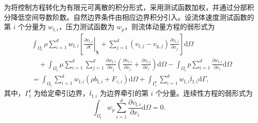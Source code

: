 为将控制方程转化为有限元可离散的积分形式，采用测试函数加权，并通过分部积分降低空间导数阶数。自然边界条件由相应边界积分引入。设流体速度测试函数的第 $i$ 个分量为 $w_{\mathrm f,i}$，压力测试函数为 $w_p$，则流体动量方程的弱形式为
\begin{equation}
\begin{aligned}
&\int_{\Omega_{\mathrm f}}
\rho
\sum_{i=1}^{d}
w_{\mathrm f,i}
\left[
\left.
\frac{\partial v_{\mathrm f,i}}{\partial t}
\right|_{\boldsymbol{\chi}}
+
\sum_{j=1}^{d}
\left(v_{\mathrm f,j}-v_{\mathrm g,j}\right)
\frac{\partial v_{\mathrm f,i}}{\partial x_j}
\right]
\mathrm d\Omega
\\
&\quad+
\int_{\Omega_{\mathrm f}}
\mu
\sum_{i=1}^{d}\sum_{j=1}^{d}
\frac{\partial w_{\mathrm f,i}}{\partial x_j}
\left(
\frac{\partial v_{\mathrm f,i}}{\partial x_j}
+
\frac{\partial v_{\mathrm f,j}}{\partial x_i}
\right)
\mathrm d\Omega
-
\int_{\Omega_{\mathrm f}}
p
\sum_{i=1}^{d}
\frac{\partial w_{\mathrm f,i}}{\partial x_i}
\mathrm d\Omega
\\
&=
\int_{\Omega_{\mathrm f}}
\sum_{i=1}^{d}
w_{\mathrm f,i}
\left(
\rho b_{\mathrm f,i}
+
F_{\gamma,i}
\right)
\mathrm d\Omega
+
\int_{\Gamma_{\mathrm t}^{\mathrm f}}
\sum_{i=1}^{d}
w_{\mathrm f,i}\bar t_{\mathrm f,i}
\mathrm d\Gamma,
\end{aligned}
\label{eq:ch2_weak_fluid_momentum}
\end{equation}
其中，$\Gamma_{\mathrm t}^{\mathrm f}$ 为给定牵引边界，$\bar t_{\mathrm f,i}$ 为边界牵引的第 $i$ 个分量。连续性方程的弱形式为
\begin{equation}
\int_{\Omega_{\mathrm f}}
w_p
\sum_{i=1}^{d}
\frac{\partial v_{\mathrm f,i}}{\partial x_i}
\mathrm d\Omega
=0.
\label{eq:ch2_weak_continuity}
\end{equation}

